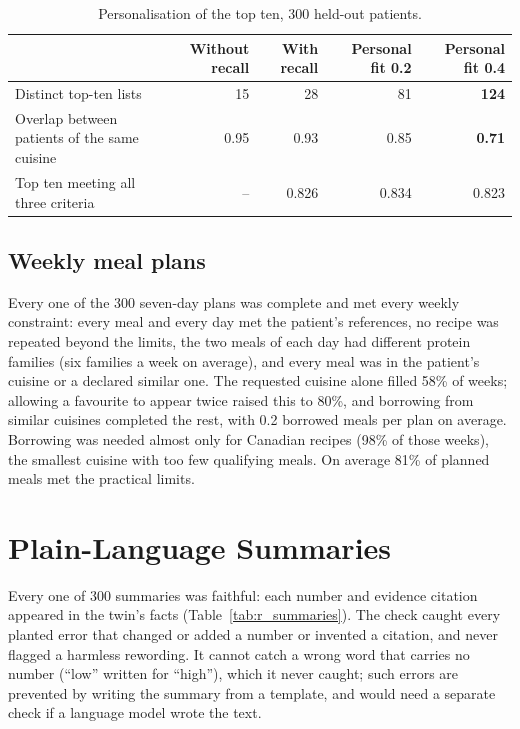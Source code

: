 \begin{table}[htbp]
\centering
\caption{Personalisation of the top ten, 300 held-out patients.}
\label{tab:r_personal}
\begin{tabular}{p{5.2cm}rrrr}
\toprule
 & Without recall & With recall & Personal fit 0.2 & Personal fit 0.4 \\
\midrule
Distinct top-ten lists & 15 & 28 & 81 & \textbf{124} \\
Overlap between patients of the same cuisine & 0.95 & 0.93 & 0.85 & \textbf{0.71} \\
Top ten meeting all three criteria & -- & 0.826 & 0.834 & 0.823 \\
\bottomrule
\end{tabular}
\end{table}

\subsection{Weekly meal plans}

Every one of the 300 seven-day plans was complete and met every weekly
constraint: every meal and every day met the patient's references, no recipe
was repeated beyond the limits, the two meals of each day had different
protein families (six families a week on average), and every meal was in the
patient's cuisine or a declared similar one. The requested cuisine alone
filled 58\% of weeks; allowing a favourite to appear twice raised this to 80\%,
and borrowing from similar cuisines completed the rest, with 0.2 borrowed
meals per plan on average. Borrowing was needed almost only for Canadian
recipes (98\% of those weeks), the smallest cuisine with too few qualifying
meals. On average 81\% of planned meals met the practical limits.

\section{Plain-Language Summaries}
\label{sec:r_summary}

Every one of 300 summaries was faithful: each number and evidence citation
appeared in the twin's facts (Table~\ref{tab:r_summaries}). The check caught
every planted error that changed or added a number or invented a citation, and
never flagged a harmless rewording. It cannot catch a wrong word that carries
no number (``low'' written for ``high''), which it never caught; such errors
are prevented by writing the summary from a template, and would need a
separate check if a language model wrote the text.

